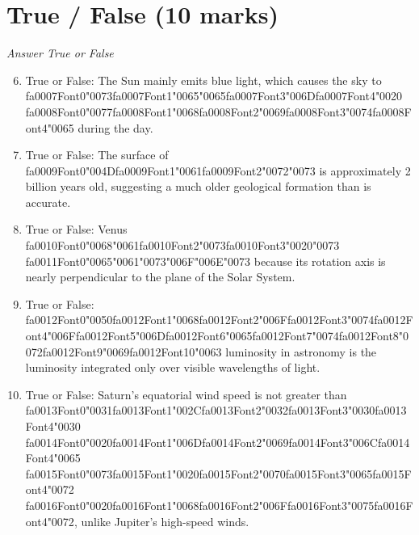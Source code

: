 \documentclass[12pt]{article}
\begin{document}
\section*{True / False (10 marks)}
\textit{Answer True or False}
\begin{enumerate}[label=\arabic*.]
\setcounter{enumi}{5}
\item True or False: The Sun mainly emits blue light, which causes the sky to {\csname fa0007Font0\endcsname\char"0073}{\csname fa0007Font1\endcsname\char"0065}{\char"0065}{\csname fa0007Font3\endcsname\char"006D}{\csname fa0007Font4\endcsname\char"0020} {\csname fa0008Font0\endcsname\char"0077}{\csname fa0008Font1\endcsname\char"0068}{\csname fa0008Font2\endcsname\char"0069}{\csname fa0008Font3\endcsname\char"0074}{\csname fa0008Font4\endcsname\char"0065} during the day.
\item True or False: The surface of {\csname fa0009Font0\endcsname\char"004D}{\csname fa0009Font1\endcsname\char"0061}{\csname fa0009Font2\endcsname\char"0072}{\char"0073} is approximately 2 billion years old, suggesting a much older geological formation than is accurate.
\item True or False: Venus {\csname fa0010Font0\endcsname\char"0068}{\char"0061}{\csname fa0010Font2\endcsname\char"0073}{\csname fa0010Font3\endcsname\char"0020}{\char"0073} {\csname fa0011Font0\endcsname\char"0065}{\char"0061}{\char"0073}{\char"006F}{\char"006E}{\char"0073} because its rotation axis is nearly perpendicular to the plane of the Solar System.
\item True or False: {\csname fa0012Font0\endcsname\char"0050}{\csname fa0012Font1\endcsname\char"0068}{\csname fa0012Font2\endcsname\char"006F}{\csname fa0012Font3\endcsname\char"0074}{\csname fa0012Font4\endcsname\char"006F}{\csname fa0012Font5\endcsname\char"006D}{\csname fa0012Font6\endcsname\char"0065}{\csname fa0012Font7\endcsname\char"0074}{\csname fa0012Font8\endcsname\char"0072}{\csname fa0012Font9\endcsname\char"0069}{\csname fa0012Font10\endcsname\char"0063} luminosity in astronomy is the luminosity integrated only over visible wavelengths of light.
\item True or False: Saturn's equatorial wind speed is not greater than {\csname fa0013Font0\endcsname\char"0031}{\csname fa0013Font1\endcsname\char"002C}{\csname fa0013Font2\endcsname\char"0032}{\csname fa0013Font3\endcsname\char"0030}{\csname fa0013Font4\endcsname\char"0030} {\csname fa0014Font0\endcsname\char"0020}{\csname fa0014Font1\endcsname\char"006D}{\csname fa0014Font2\endcsname\char"0069}{\csname fa0014Font3\endcsname\char"006C}{\csname fa0014Font4\endcsname\char"0065} {\csname fa0015Font0\endcsname\char"0073}{\csname fa0015Font1\endcsname\char"0020}{\csname fa0015Font2\endcsname\char"0070}{\csname fa0015Font3\endcsname\char"0065}{\csname fa0015Font4\endcsname\char"0072} {\csname fa0016Font0\endcsname\char"0020}{\csname fa0016Font1\endcsname\char"0068}{\csname fa0016Font2\endcsname\char"006F}{\csname fa0016Font3\endcsname\char"0075}{\csname fa0016Font4\endcsname\char"0072}, unlike Jupiter's high-speed winds.
\end{enumerate}
\end{document}
